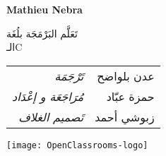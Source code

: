 \thispagestyle{empty}
\cleardoublepage
\thispagestyle{empty}
\begin{center}
{\fontsize{0.7cm}{1.4cm}\selectfont\bfseries
\textcolor{section}{\textenglish{Mathieu Nebra}}
}

\vspace{1cm}
\textcolor{chapter}{\mdseries
{\fontsize{2cm}{4cm}\selectfont
تَعَلَّم البَرْمَجَة بلُغَة}\\
{\fontsize{3cm}{6cm}\selectfont
الـ\textenglish{C}
}
}

\vfill

{
\fontsize{0.5cm}{1.5cm}\selectfont

\begin{tabu} to 0.5
تَرْجَمَة & عدن بلواضح\\
مُرَاجَعَة و إعْدَاد & حمزة عبّاد\\
تَصميم الغلاف & زبوشي أحمد\\
\end{tabu}
}

\vfill
\texttt{[image: OpenClassrooms-logo]}
\end{center}

